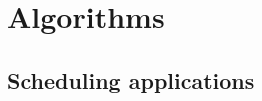 \documentclass[conference]{IEEEtran}
\begin{document}
%
%


\section{Algorithms}\label{sec:algorithms}

\subsection{Scheduling applications}
\end{document}
